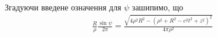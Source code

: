 Згадуючи введене означення для $ \psi $ зашипимо, що
%
%
%
%
\begin{equation*} \begin{aligned}
\frac{R}{\rho} \frac{\sin \psi}{2 \pi} = 
\frac{\sqrt{4 \rho^2 R^2 - (\rho^2 + R^2 - c^2t^2 + z^2)^2}}{4 \pi \rho^2}
\end{aligned} \end{equation*}
